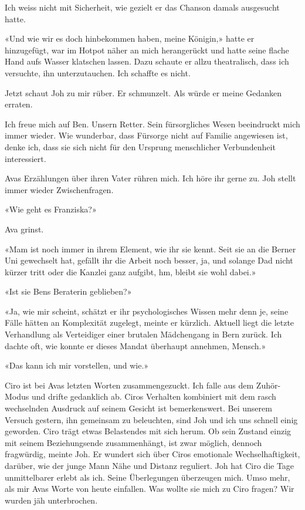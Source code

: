 Ich weiss nicht mit Sicherheit, wie gezielt er das Chanson damals
ausgesucht hatte.

«Und wie wir es doch hinbekommen haben, meine Königin,» hatte er
hinzugefügt, war im Hotpot näher an mich herangerückt und hatte seine
flache Hand aufs Wasser klatschen lassen. Dazu schaute er allzu
theatralisch, dass ich versuchte, ihn unterzutauchen. Ich schaffte es
nicht.

Jetzt schaut Joh zu mir rüber. Er schmunzelt. Als würde er meine
Gedanken erraten.

Ich freue mich auf Ben. Unsern Retter. Sein fürsorgliches Wesen
beeindruckt mich immer wieder. Wie wunderbar, dass Fürsorge nicht auf
Familie angewiesen ist, denke ich, dass sie sich nicht für den Ursprung
menschlicher Verbundenheit interessiert.

Avas Erzählungen über ihren Vater rühren mich. Ich höre ihr gerne zu.
Joh stellt immer wieder Zwischenfragen.

«Wie geht es Franziska?»

Ava grinst.

«Mam ist noch immer in ihrem Element, wie ihr sie kennt. Seit sie an die
Berner Uni gewechselt hat, gefällt ihr die Arbeit noch besser, ja, und
solange Dad nicht kürzer tritt oder die Kanzlei ganz aufgibt, hm, bleibt
sie wohl dabei.»

«Ist sie Bens Beraterin geblieben?»

«Ja, wie mir scheint, schätzt er ihr psychologisches Wissen mehr denn
je, seine Fälle hätten an Komplexität zugelegt, meinte er kürzlich.
Aktuell liegt die letzte Verhandlung als Verteidiger einer brutalen
Mädchengang in Bern zurück. Ich dachte oft, wie konnte er dieses Mandat
überhaupt annehmen, Mensch.»

«Das kann ich mir vorstellen, und wie.»

Ciro ist bei Avas letzten Worten zusammengezuckt. Ich falle aus dem
Zuhör-Modus und drifte gedanklich ab. Ciros Verhalten kombiniert mit dem
rasch wechselnden Ausdruck auf seinem Gesicht ist bemerkenswert. Bei
unserem Versuch gestern, ihn gemeinsam zu beleuchten, sind Joh und ich
uns schnell einig geworden. Ciro trägt etwas Belastendes mit sich herum.
Ob sein Zustand einzig mit seinem Beziehungsende zusammenhängt, ist zwar
möglich, dennoch fragwürdig, meinte Joh. Er wundert sich über Ciros
emotionale Wechselhaftigkeit, darüber, wie der junge Mann Nähe und
Distanz reguliert. Joh hat Ciro die Tage unmittelbarer erlebt als ich.
Seine Überlegungen überzeugen mich. Umso mehr, als mir Avas Worte von
heute einfallen. Was wollte sie mich zu Ciro fragen? Wir wurden jäh
unterbrochen.


